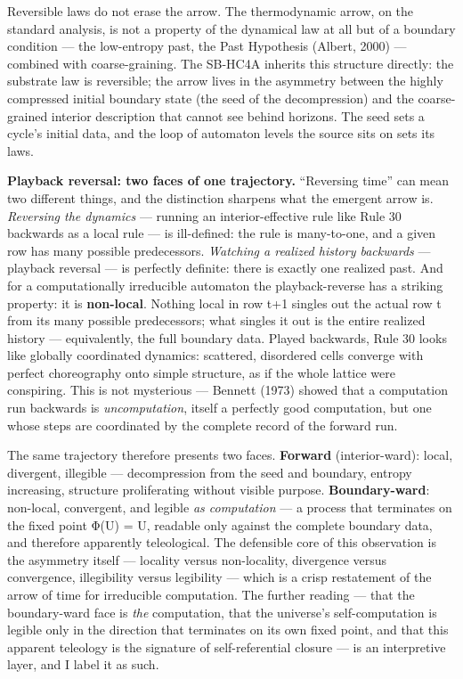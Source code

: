 \documentclass[
]{article}
\begin{document}
Reversible laws do not erase the arrow. The thermodynamic arrow, on the
standard analysis, is not a property of the dynamical law at all but of
a boundary condition --- the low-entropy past, the Past Hypothesis
(Albert, 2000) --- combined with coarse-graining. The SB-HC4A inherits
this structure directly: the substrate law is reversible; the arrow
lives in the asymmetry between the highly compressed initial boundary
state (the seed of the decompression) and the coarse-grained interior
description that cannot see behind horizons. The seed sets a cycle's
initial data, and the loop of automaton levels the source sits on sets
its laws.

\textbf{Playback reversal: two faces of one trajectory.} ``Reversing
time'' can mean two different things, and the distinction sharpens what
the emergent arrow is. \emph{Reversing the dynamics} --- running an
interior-effective rule like Rule 30 backwards as a local rule --- is
ill-defined: the rule is many-to-one, and a given row has many possible
predecessors. \emph{Watching a realized history backwards} --- playback
reversal --- is perfectly definite: there is exactly one realized past.
And for a computationally irreducible automaton the playback-reverse has
a striking property: it is \textbf{non-local}. Nothing local in row t+1
singles out the actual row t from its many possible predecessors; what
singles it out is the entire realized history --- equivalently, the full
boundary data. Played backwards, Rule 30 looks like globally coordinated
dynamics: scattered, disordered cells converge with perfect choreography
onto simple structure, as if the whole lattice were conspiring. This is
not mysterious --- Bennett (1973) showed that a computation run
backwards is \emph{uncomputation}, itself a perfectly good computation,
but one whose steps are coordinated by the complete record of the
forward run.

The same trajectory therefore presents two faces. \textbf{Forward}
(interior-ward): local, divergent, illegible --- decompression from the
seed and boundary, entropy increasing, structure proliferating without
visible purpose. \textbf{Boundary-ward}: non-local, convergent, and
legible \emph{as computation} --- a process that terminates on the fixed
point Φ(U) = U, readable only against the complete boundary data, and
therefore apparently teleological. The defensible core of this
observation is the asymmetry itself --- locality versus non-locality,
divergence versus convergence, illegibility versus legibility --- which
is a crisp restatement of the arrow of time for irreducible computation.
The further reading --- that the boundary-ward face is \emph{the}
computation, that the universe's self-computation is legible only in the
direction that terminates on its own fixed point, and that this apparent
teleology is the signature of self-referential closure --- is an
interpretive layer, and I label it as such.
\end{document}
